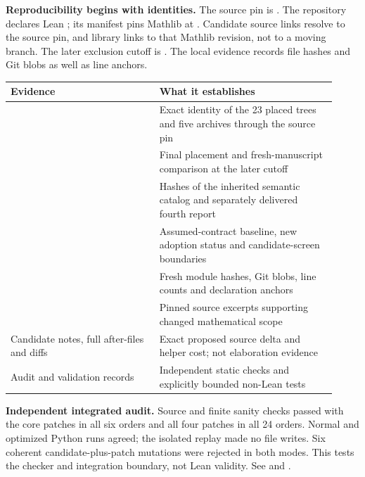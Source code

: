 \textbf{Reproducibility begins with identities.} The source pin is
.
The repository declares Lean ; its manifest pins Mathlib at
.
Candidate source links resolve to the source pin, and library links to that Mathlib revision, not to a moving branch. The later exclusion cutoff is . The local evidence records file hashes and Git blobs as well as line anchors.

\begin{tabular}{@{}L{0.42\linewidth}L{0.50\linewidth}@{}}\toprule
Evidence & What it establishes\\\midrule
{} & Exact identity of the 23 placed trees and five archives through the source pin\\[5pt]
 & Final placement and fresh-manuscript comparison at the later cutoff\\[5pt]
 & Hashes of the inherited semantic catalog and separately delivered fourth report\\[5pt]
 & Assumed-contract baseline, new adoption status and candidate-screen boundaries\\[5pt]
 & Fresh module hashes, Git blobs, line counts and declaration anchors\\[5pt]
 & Pinned source excerpts supporting changed mathematical scope\\[5pt]
Candidate notes, full after-files and diffs & Exact proposed source delta and helper cost; not elaboration evidence\\[5pt]
Audit and validation records & Independent static checks and explicitly bounded non-Lean tests\\\bottomrule
\end{tabular}

\textbf{Independent integrated audit.} Source and finite sanity checks passed with the core patches in all six orders and all four patches in all 24 orders. Normal and optimized Python runs agreed; the isolated replay made no file writes. Six coherent candidate-plus-patch mutations were rejected in both modes. This tests the checker and integration boundary, not Lean validity. See  and .

